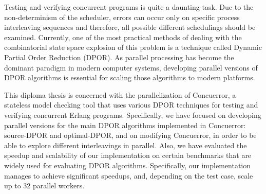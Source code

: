 Testing and verifying concurrent programs is quite a daunting task. Due to the non-determinism of the scheduler, errors can occur only on specific process interleaving sequences and therefore, all possible different schedulings should be examined. Currently, one of the most practical methods of dealing with the combinatorial state space explosion of this problem is a technique called Dynamic Partial Order Reduction (DPOR). As parallel processing has become the dominant paradigm in modern computer systems, developing parallel versions of DPOR algorithms is essential for scaling those algorithms to modern platforms.

This diploma thesis is concerned with the parallelization of Concuerror, a stateless model checking tool that uses various DPOR techniques for testing and verifying concurrent Erlang programs. Specifically, we have focused on developing parallel versions for the main DPOR algorithms implemented in Concuerror: source-DPOR and optimal-DPOR, and on modifying Concuerror,  in order to be able to explore different interleavings in parallel. Also, we have evaluated the speedup and scalability of our implementation on certain benchmarks that are widely used for evaluating DPOR algorithms. Specifically, our implementation manages to achieve significant speedups, and, depending on the test case, scale up to 32 parallel workers.
